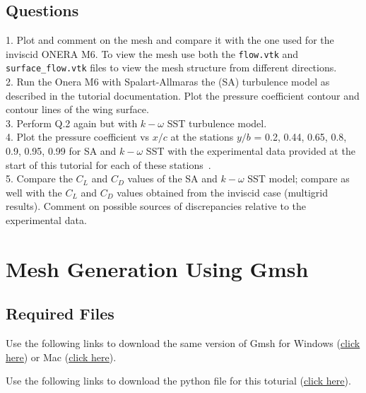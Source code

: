 \section{Questions}
1. Plot and comment on the mesh and compare it with the one used for the inviscid ONERA M6. To view the mesh use both the \texttt{flow.vtk} and \texttt{surface\_flow.vtk} files to view the mesh structure from different directions. \\
2. Run the Onera M6 with Spalart-Allmaras the (SA) turbulence model as described in the tutorial documentation. Plot the pressure coefficient contour and contour lines of the wing surface. \\
3. Perform Q.2 again but with $k-\omega$ SST turbulence model. \\
4. Plot the pressure coefficient vs $x/c$ at the stations $y/b$ = 0.2, 0.44, 0.65, 0.8, 0.9, 0.95, 0.99 for SA and $k-\omega$ SST with the experimental data provided at the start of this tutorial for each of these stations~\cite{schmitt1979pressure}. \\
5. Compare the $C_L$ and $C_D$ values of the SA and $k-\omega$ SST model; compare as well with the $C_L$ and $C_D$ values obtained from the inviscid case (multigrid results). Comment on possible sources of discrepancies relative to the experimental data.
\chapter{Mesh Generation Using Gmsh}
\label{ch:Mesh Generation Unisg Gmsh}
\section{Required Files}
\begin{gmshnote}
	Use the following links to download the same version of Gmsh for Windows (\href{https://users.encs.concordia.ca/~bvermeir/book/executables/windows/gmsh-3.0.5-Windows64.zip}{\underline{click here}}) or Mac (\href{https://users.encs.concordia.ca/~bvermeir/book/executables/osx/gmsh-3.0.5-MacOSX.dmg}{\underline{click here}}).
\end{gmshnote}
\begin{pythonnote}
	Use the following links to download the python file for this toturial (\href{https://gitlab.com/bvermeir/book-cfd/blob/master/tutorial/tut6_mesh_generation/gmshconverter.py}{\underline{click here}}).
\end{pythonnote}

